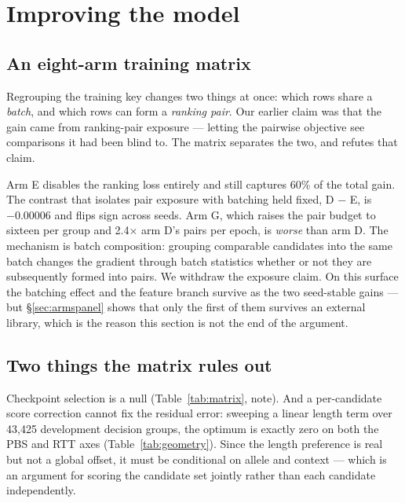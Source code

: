 \documentclass[11pt]{article}
\begin{document}
\section{Improving the model}

\subsection{An eight-arm training matrix}
\label{sec:matrix}



Regrouping the training key changes two things at once: which rows share a \emph{batch}, and
which rows can form a \emph{ranking pair}. Our earlier claim was that the gain came from
ranking-pair exposure --- letting the pairwise objective see comparisons it had been blind to.
The matrix separates the two, and refutes that claim.

Arm E disables the ranking loss entirely and still captures 60\% of the total gain. The
contrast that isolates pair exposure with batching held fixed, D $-$ E, is $-0.00006$ and
flips sign across seeds. Arm G, which raises the pair budget to sixteen per group and
2.4$\times$ arm D's pairs per epoch, is \emph{worse} than arm D. The mechanism is batch
composition: grouping comparable candidates into the same batch changes the gradient through
batch statistics whether or not they are subsequently formed into pairs. We withdraw the
exposure claim. On this surface the batching effect and the feature branch survive as the two
seed-stable gains --- but \S\ref{sec:armspanel} shows that only the first of them survives an
external library, which is the reason this section is not the end of the argument.

\subsection{Two things the matrix rules out}

Checkpoint selection is a null (Table~\ref{tab:matrix}, note). And a per-candidate score
correction cannot fix the residual error: sweeping a linear length term over 43{,}425
development decision groups, the optimum is exactly zero on both the PBS and RTT axes
(Table~\ref{tab:geometry}). Since the length preference is real but not a global offset, it
must be conditional on allele and context --- which is an argument for scoring the candidate
set jointly rather than each candidate independently.
\end{document}
